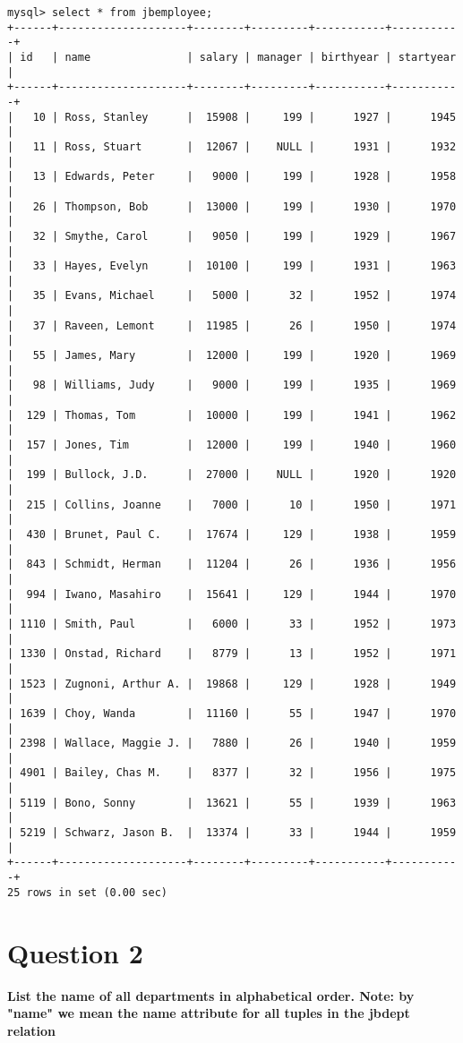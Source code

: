 \documentclass{article}
\begin{document}
\begin{lstlisting}
mysql> select * from jbemployee;
+------+--------------------+--------+---------+-----------+-----------+
| id   | name               | salary | manager | birthyear | startyear |
+------+--------------------+--------+---------+-----------+-----------+
|   10 | Ross, Stanley      |  15908 |     199 |      1927 |      1945 |
|   11 | Ross, Stuart       |  12067 |    NULL |      1931 |      1932 |
|   13 | Edwards, Peter     |   9000 |     199 |      1928 |      1958 |
|   26 | Thompson, Bob      |  13000 |     199 |      1930 |      1970 |
|   32 | Smythe, Carol      |   9050 |     199 |      1929 |      1967 |
|   33 | Hayes, Evelyn      |  10100 |     199 |      1931 |      1963 |
|   35 | Evans, Michael     |   5000 |      32 |      1952 |      1974 |
|   37 | Raveen, Lemont     |  11985 |      26 |      1950 |      1974 |
|   55 | James, Mary        |  12000 |     199 |      1920 |      1969 |
|   98 | Williams, Judy     |   9000 |     199 |      1935 |      1969 |
|  129 | Thomas, Tom        |  10000 |     199 |      1941 |      1962 |
|  157 | Jones, Tim         |  12000 |     199 |      1940 |      1960 |
|  199 | Bullock, J.D.      |  27000 |    NULL |      1920 |      1920 |
|  215 | Collins, Joanne    |   7000 |      10 |      1950 |      1971 |
|  430 | Brunet, Paul C.    |  17674 |     129 |      1938 |      1959 |
|  843 | Schmidt, Herman    |  11204 |      26 |      1936 |      1956 |
|  994 | Iwano, Masahiro    |  15641 |     129 |      1944 |      1970 |
| 1110 | Smith, Paul        |   6000 |      33 |      1952 |      1973 |
| 1330 | Onstad, Richard    |   8779 |      13 |      1952 |      1971 |
| 1523 | Zugnoni, Arthur A. |  19868 |     129 |      1928 |      1949 |
| 1639 | Choy, Wanda        |  11160 |      55 |      1947 |      1970 |
| 2398 | Wallace, Maggie J. |   7880 |      26 |      1940 |      1959 |
| 4901 | Bailey, Chas M.    |   8377 |      32 |      1956 |      1975 |
| 5119 | Bono, Sonny        |  13621 |      55 |      1939 |      1963 |
| 5219 | Schwarz, Jason B.  |  13374 |      33 |      1944 |      1959 |
+------+--------------------+--------+---------+-----------+-----------+
25 rows in set (0.00 sec)
\end{lstlisting}

\section*{Question 2}
\textbf{List the name of all departments in alphabetical order. Note: by "name" we mean the name attribute for all tuples in the jbdept relation}
\end{document}
